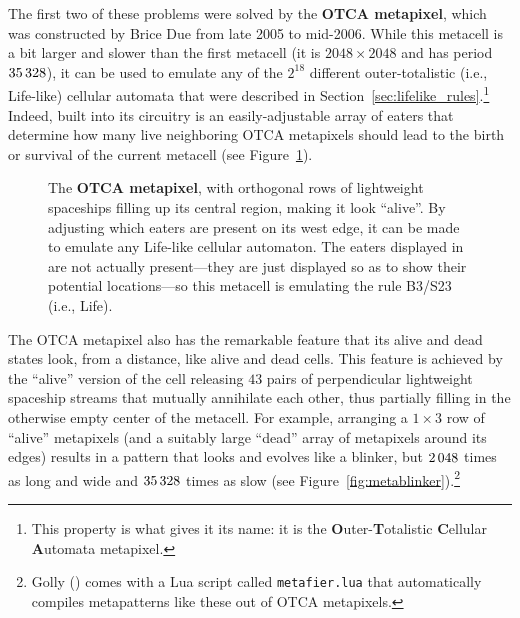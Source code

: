 The first two of these problems were solved by the \textbf{OTCA metapixel}, which was constructed by Brice Due from late 2005 to mid-2006. While this metacell is a bit larger and slower than the first metacell (it is $2048 \times 2048$ and has period $35{\,}328$), it can be used to emulate any of the $2^{18}$ different outer-totalistic (i.e., Life-like) cellular automata that were described in Section~\ref{sec:lifelike_rules}.\footnote{This property is what gives it its name: it is the \textbf{O}uter-\textbf{T}otalistic \textbf{C}ellular \textbf{A}utomata metapixel.} Indeed, built into its circuitry is an easily-adjustable array of eaters that determine how many live neighboring OTCA metapixels should lead to the birth or survival of the current metacell (see Figure~\ref{fig:otca_metapixel}). 

\begin{figure}[!htb]
	\centering
	\caption{The \textbf{OTCA metapixel}, with orthogonal rows of lightweight spaceships filling up its central region, making it look ``alive''. By adjusting which eaters are present on its west edge, it can be made to emulate any Life-like cellular automaton. The eaters displayed in  are not actually present---they are just displayed so as to show their potential locations---so this metacell is emulating the rule B3/S23 (i.e., Life).}
	\label{fig:otca_metapixel}
\end{figure}

The OTCA metapixel also has the remarkable feature that its alive and dead states look, from a distance, like alive and dead cells. This feature is achieved by the ``alive'' version of the cell releasing $43$ pairs of perpendicular lightweight spaceship streams that mutually annihilate each other, thus partially filling in the otherwise empty center of the metacell. For example, arranging a $1 \times 3$ row of ``alive'' metapixels (and a suitably large ``dead'' array of metapixels around its edges) results in a pattern that looks and evolves like a blinker, but $2{\,}048$ times as long and wide and $35{\,}328$ times as slow (see Figure~\ref{fig:metablinker}).\footnote{Golly () comes with a Lua script called \texttt{metafier.lua} that automatically compiles metapatterns like these out of OTCA metapixels.}

